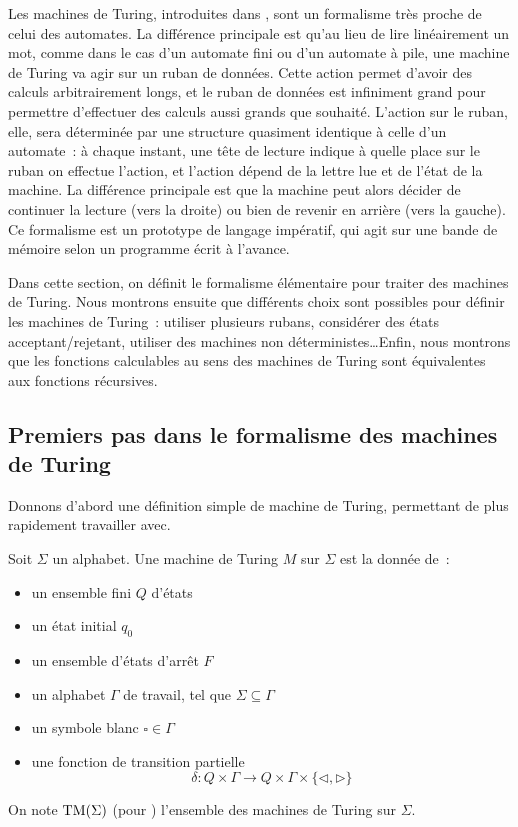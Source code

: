Les machines de Turing, introduites dans \cite{turing1936a}, sont un formalisme
très proche de celui des automates. La différence principale est qu'au lieu
de lire linéairement un mot, comme dans le cas d'un automate fini ou d'un
automate à pile, une machine de Turing va agir sur un ruban de données. Cette
action permet d'avoir des calculs arbitrairement longs, et le ruban de données
est infiniment grand pour permettre d'effectuer des calculs aussi grands que
souhaité. L'action sur le ruban, elle, sera déterminée par une structure
quasiment identique à celle d'un automate~: à chaque instant, une tête de
lecture indique à quelle place sur le ruban on effectue l'action, et l'action
dépend de la lettre lue et de l'état de la machine. La différence principale est
que la machine peut alors décider de continuer la lecture (vers la droite) ou
bien de revenir en arrière (vers la gauche). Ce formalisme est un prototype de
langage impératif, qui agit sur une bande de mémoire selon un programme écrit à
l'avance.

Dans cette section, on définit le formalisme élémentaire pour traiter des
machines de Turing. Nous montrons ensuite que différents choix sont possibles
pour définir les machines de Turing~: utiliser plusieurs rubans, considérer des
états acceptant/rejetant, utiliser des machines non déterministes\ldots Enfin,
nous montrons que les fonctions calculables au sens des machines de Turing sont
équivalentes aux fonctions récursives.

\subsection{Premiers pas dans le formalisme des machines de Turing}

Donnons d'abord une définition simple de machine de Turing, permettant de plus
rapidement travailler avec.

\begin{definition}
  Soit $\Sigma$ un alphabet. Une machine de Turing $M$ sur $\Sigma$ est la
  donnée de~:
  \begin{itemize}
  \item un ensemble fini $Q$ d'états
  \item un état initial $q_0$
  \item un ensemble d'états d'arrêt $F$
  \item un alphabet $\Gamma$ de travail, tel que $\Sigma \subseteq \Gamma$
  \item un symbole blanc $\square \in \Gamma$
  \item une fonction de transition partielle
    \[\delta : Q \times \Gamma \longrightarrow Q \times \Gamma \times
    \{\lhd,\rhd\}\]
  \end{itemize}

  On note $\operatorname{TM}(\Sigma)$ (pour ) l'ensemble des
  machines de Turing sur $\Sigma$.
\end{definition}

